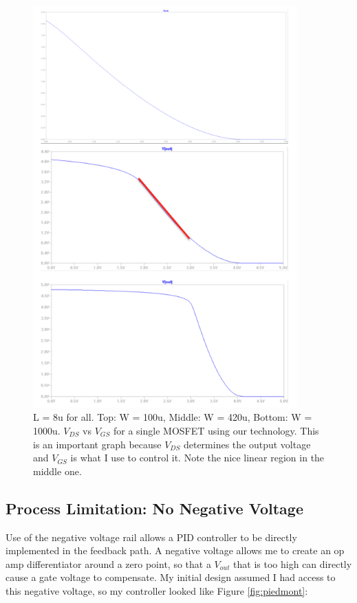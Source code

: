 \documentclass[10pt]{amsart}
\begin{document}
\begin{figure}[h]
	\begin{center}
		\includegraphics[width=4.0in]{Media/WL.png}
	\end{center}
	\caption{L = 8u for all. Top: W = 100u, Middle: W = 420u, Bottom: W = 1000u. $V_{DS}$ vs $V_{GS}$ for a single MOSFET using our technology. This is an important graph because $V_{DS}$ determines the output voltage and $V_{GS}$ is what I use to control it. Note the nice linear region in the middle one.}
	\label{fig:wl}
\end{figure}


\subsection{Process Limitation: No Negative Voltage}

Use of the negative voltage rail allows a PID controller to be directly implemented in the feedback path. A negative voltage allows me to create an op amp differentiator around a zero point, so that a $V_{out}$ that is too high can directly cause a gate voltage to compensate. My initial design assumed I had access to this negative voltage, so my controller looked like Figure \ref{fig:piedmont}: \\
\end{document}
